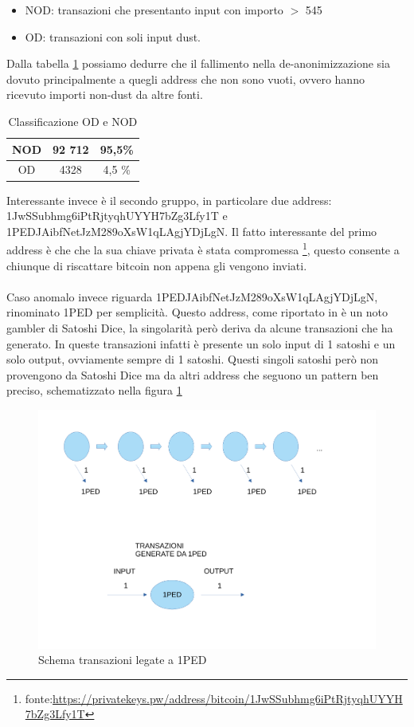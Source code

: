 \begin{itemize}
    \item NOD: transazioni che presentanto input con importo $>$ 545  
    \item OD: transazioni con soli input dust.
\end{itemize}
Dalla tabella \ref{tab:OD_NOD_failed} possiamo dedurre che il fallimento nella de-anonimizzazione sia dovuto principalmente a quegli address che non sono vuoti, ovvero hanno ricevuto importi non-dust da altre fonti. 
\begin{table}[H]
    \centering
    \begin{tabular}{|c|c|c|}
        \hline
            NOD  & 92 712 & 95,5\%\\
        \hline 
            OD  & 4328 & 4,5 \%\\
        \hline
    \end{tabular}
    \caption{Classificazione OD e NOD}
    \label{tab:OD_NOD_failed}
\end{table}
Interessante invece è il secondo gruppo, in particolare due address: 1JwSSubhmg6iPtRjtyqhUYYH7bZg3Lfy1T e 1PEDJAibfNetJzM289oXsW1qLAgjYDjLgN. Il fatto interessante del primo address è che che la sua chiave privata è stata compromessa \footnote{fonte:\url{https://privatekeys.pw/address/bitcoin/1JwSSubhmg6iPtRjtyqhUYYH7bZg3Lfy1T}}, questo consente a chiunque di riscattare bitcoin non appena gli vengono inviati.\\\\
Caso anomalo invece riguarda 1PEDJAibfNetJzM289oXsW1qLAgjYDjLgN, rinominato 1PED per semplicità. Questo address, come riportato in \cite{dustAnalisi} è un noto gambler di Satoshi Dice, la singolarità però deriva da alcune transazioni che ha generato. In queste transazioni infatti è presente un solo input di 1 satoshi e un solo output, ovviamente sempre di 1 satoshi. Questi singoli satoshi però non provengono da Satoshi Dice ma da altri address che seguono un pattern ben preciso, schematizzato nella figura \ref{fig:1PED}
\begin{figure}[h!]
    \centering
    \includegraphics[scale=0.4]{Images/1Ped.pdf}
    \caption{Schema transazioni legate a 1PED}
    \label{fig:1PED}
\end{figure}
